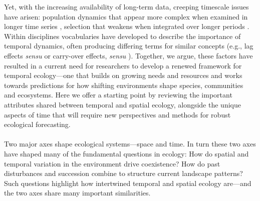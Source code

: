 \documentclass[11pt,a4paper,oneside]{article}
\begin{document}
Yet, with the increasing availability of long-term data, creeping timescale issues have arisen: population dynamics that appear more complex when examined in longer time series \citep{Ziebarth2010}, selection that weakens when integrated over longer periods \citep{schoener2011,Uyeda2011}. Within disciplines vocabularies have developed to describe the importance of temporal dynamics, often producing differing terms for similar concepts (e.g., lag effects \emph{sensu} \cite{Reichmann2013} or carry-over effects, \emph{sensu} \cite{Betini2013}). Together, we argue, these factors have resulted in a current need for researchers to develop a renewed framework for temporal ecology---one that builds on growing needs and resources and works towards predictions for how shifting environments shape species, communities and ecosystems. Here we offer a starting point by reviewing the important attributes shared between temporal and spatial ecology, alongside the unique aspects of time that will require new perspectives and methods for robust ecological forecasting. \\

\\

Two major axes shape ecological systems---space and time. In turn these two axes have shaped many of the fundamental questions in ecology: How do spatial and temporal variation in the environment drive coexistence? How do past disturbances and succession combine to structure current landscape patterns? Such questions highlight how intertwined temporal and spatial ecology are---and the two axes share many important similarities.\\
\end{document}
